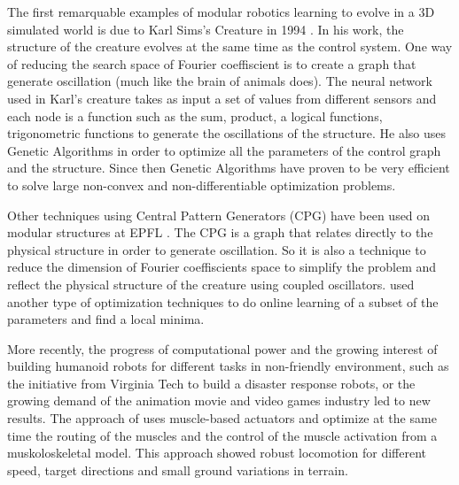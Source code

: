 The first remarquable examples of modular robotics learning to evolve in a 3D simulated world is due to Karl Sims's Creature in 1994 \cite{karl}. In his work, the structure of the creature evolves at the same time as the control system. One way of reducing the search space of Fourier coeffiscient is to create a graph that generate oscillation (much like the brain of animals does). The neural network used in Karl's creature takes as input a set of values from different sensors and each node is a function such as the sum, product, a logical functions, trigonometric functions to generate the oscillations of the structure. He also uses Genetic Algorithms in order to optimize all the parameters of the control graph and the structure. Since then Genetic Algorithms have proven to be very efficient to solve large non-convex and non-differentiable optimization problems.

Other techniques using Central Pattern Generators (CPG) have been used on modular structures at EPFL \cite{marbach} \cite{sproewitz}. The CPG is a graph that relates directly to the physical structure in order to generate oscillation. So it is also a technique to reduce the dimension of Fourier coeffiscients space to simplify the problem and reflect the physical structure of the creature using coupled oscillators. \cite{marbach} used another type of optimization techniques to do online learning of a subset of the parameters and find a local minima.

More recently, the progress of computational power and the growing interest of building humanoid robots for different tasks in non-friendly environment, such as the initiative from Virginia Tech to build a disaster response robots, or the growing demand of the animation movie and video games industry led to new results. The approach of \cite{MuscleBasedBipeds} uses muscle-based actuators and optimize at the same time the routing of the muscles and the control of the muscle activation from a muskoloskeletal model. This approach showed robust locomotion for different speed, target directions and small ground variations in terrain.


